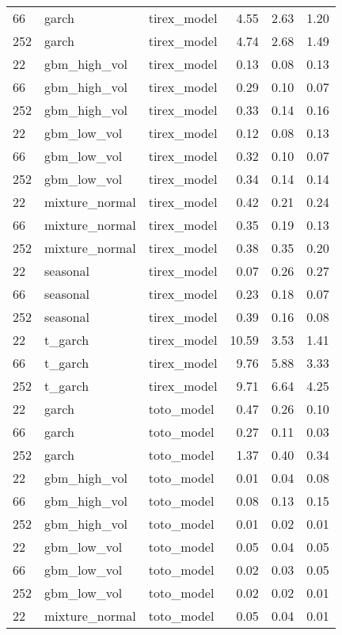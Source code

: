 {\begin{tabular}{lllrrr}
66 & garch & tirex\_model & 4.55 & 2.63 & 1.20 \\
252 & garch & tirex\_model & 4.74 & 2.68 & 1.49 \\
\midrule
22 & gbm\_high\_vol & tirex\_model & 0.13 & 0.08 & 0.13 \\
66 & gbm\_high\_vol & tirex\_model & 0.29 & 0.10 & 0.07 \\
252 & gbm\_high\_vol & tirex\_model & 0.33 & 0.14 & 0.16 \\
\midrule
22 & gbm\_low\_vol & tirex\_model & 0.12 & 0.08 & 0.13 \\
66 & gbm\_low\_vol & tirex\_model & 0.32 & 0.10 & 0.07 \\
252 & gbm\_low\_vol & tirex\_model & 0.34 & 0.14 & 0.14 \\
\midrule
22 & mixture\_normal & tirex\_model & 0.42 & 0.21 & 0.24 \\
66 & mixture\_normal & tirex\_model & 0.35 & 0.19 & 0.13 \\
252 & mixture\_normal & tirex\_model & 0.38 & 0.35 & 0.20 \\
\midrule
22 & seasonal & tirex\_model & 0.07 & 0.26 & 0.27 \\
66 & seasonal & tirex\_model & 0.23 & 0.18 & 0.07 \\
252 & seasonal & tirex\_model & 0.39 & 0.16 & 0.08 \\
\midrule
22 & t\_garch & tirex\_model & 10.59 & 3.53 & 1.41 \\
66 & t\_garch & tirex\_model & 9.76 & 5.88 & 3.33 \\
252 & t\_garch & tirex\_model & 9.71 & 6.64 & 4.25 \\
\midrule
22 & garch & toto\_model & 0.47 & 0.26 & 0.10 \\
66 & garch & toto\_model & 0.27 & 0.11 & 0.03 \\
252 & garch & toto\_model & 1.37 & 0.40 & 0.34 \\
\midrule
22 & gbm\_high\_vol & toto\_model & 0.01 & 0.04 & 0.08 \\
66 & gbm\_high\_vol & toto\_model & 0.08 & 0.13 & 0.15 \\
252 & gbm\_high\_vol & toto\_model & 0.01 & 0.02 & 0.01 \\
\midrule
22 & gbm\_low\_vol & toto\_model & 0.05 & 0.04 & 0.05 \\
66 & gbm\_low\_vol & toto\_model & 0.02 & 0.03 & 0.05 \\
252 & gbm\_low\_vol & toto\_model & 0.02 & 0.02 & 0.01 \\
\midrule
22 & mixture\_normal & toto\_model & 0.05 & 0.04 & 0.01 \\

\end{tabular}}

